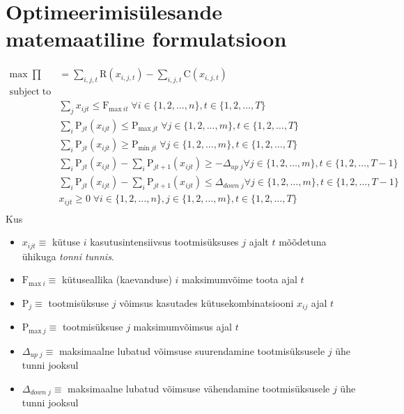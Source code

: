\documentclass[twosided, 10pt, a4paper]{article}
\begin{document}
\section{Optimeerimis\"ulesande matemaatiline formulatsioon}
\begin{align}
\mathrm{max}\; \prod &= \sum_{i,j,t} \mathrm{R}(x_{i,j,t}) - \sum_{i,j,t} \mathrm{C}(x_{i,j,t})\nonumber\\
\mathrm{subject \; to} &\nonumber \\
&\sum_{j} x_{ijt} \le\mathrm{F}_{\mathrm{max} \: it} \; \forall i \in \{1,2,\dots,n\} , t \in \{1,2,\dots,T\} \nonumber \\
&\sum_i \mathrm{P}_{jt}(x_{ijt}) \le\mathrm{P}_{\mathrm{max} \: jt} \; \forall j \in \{1,2,\dots,m\} , t \in \{1,2,\dots,T\}\nonumber \\
&\sum_{i} \mathrm{P}_{jt}(x_{ijt}) \ge\mathrm{P}_{\mathrm{min} \: jt} \; \forall j \in \{1,2,\dots,m\} , t \in \{1,2,\dots,T\}\nonumber \\
&\sum_{i} \mathrm{P}_{jt}(x_{ijt}) - \sum_{i} \mathrm{P}_{jt+1}(x_{ijt}) \ge -\Delta_{up \; j} \forall j \in \{1,2,\dots,m\} , t \in \{1,2,\dots,T-1\} \nonumber \\
&\sum_{i} \mathrm{P}_{jt}(x_{ijt}) - \sum_{i} \mathrm{P}_{jt+1}(x_{ijt}) \le \Delta_{down \; j} \forall j \in \{1,2,\dots,m\} , t \in \{1,2,\dots,T-1\} \nonumber \\
&x_{ijt} \ge 0 \; \forall i \in \{1,2, \dots ,n\},  j \in \{1,2, \dots ,m\},  t \in \{1,2, \dots ,T\} \nonumber \\
\nonumber
\end{align}
Kus
\begin{itemize}
\item[ ] $x_{ijt} \equiv$ k\"utuse $i$ kasutusintensiivsus tootmis\"uksuses $j$ ajalt $t$ m\~o\~odetuna \"uhikuga \emph{tonni tunnis}.
\item[ ] $\mathrm{F}_{\mathrm{max} \: i} \equiv$ k\"utuseallika (kaevanduse) $i$ maksimumv\~oime toota ajal $t$
\item[ ] $\mathrm{P}_{j} \equiv$  tootmis\"uksuse $j$ v\~oimsus kasutades k\"utusekombinatsiooni $x_{ij}$ ajal $t$
\item[ ] $\mathrm{P}_{\mathrm{max} \: j} \equiv$   tootmis\"uksuse $j$ maksimumv\~oimsus ajal $t$
\item[ ] $\Delta_{up \; j} \equiv$ maksimaalne lubatud v\~oimsuse suurendamine  tootmis\"uksusele $j$ \"uhe tunni jooksul
\item[ ] $\Delta_{down \; j} \equiv$ maksimaalne lubatud v\~oimsuse v\"ahendamine  tootmis\"uksusele $j$ \"uhe tunni jooksul
\end{itemize}
\end{document}
